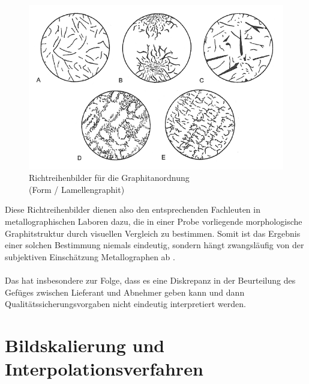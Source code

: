 \documentclass[
fontsize=10pt, 
listof = totoc,
parskip = half	
]{report}
\newcommand{\uproman}[1]{\uppercase\expandafter{\romannumeral#1}}
\begin{document}
\begin{figure}[H]
	\centering
	\includegraphics[scale=0.5]{pics/Anordnungsklassen}
	\caption{Richtreihenbilder für die Graphitanordnung\\ (Form \uproman{1} / Lamellengraphit) \cite{ISO945}}
	\label{fig:Anordnungsklassen}
\end{figure}

\noindent Diese Richtreihenbilder dienen also den entsprechenden Fachleuten in metallographischen Laboren dazu, die in einer Probe vorliegende morphologische Graphitstruktur durch visuellen Vergleich zu bestimmen. Somit ist das Ergebnis einer solchen Bestimmung niemals eindeutig, sondern hängt zwangsläufig von der subjektiven Einschätzung Metallographen ab \cite{ISO945}.
\\\\
\noindent Das hat insbesondere zur Folge, dass es eine Diskrepanz in der Beurteilung des Gefüges zwischen Lieferant und Abnehmer geben kann und dann Qualitätssicherungsvorgaben nicht eindeutig interpretiert werden.

\section{Bildskalierung und Interpolationsverfahren}
\label{subsec:SkalierungUndInterpolation}
\end{document}
